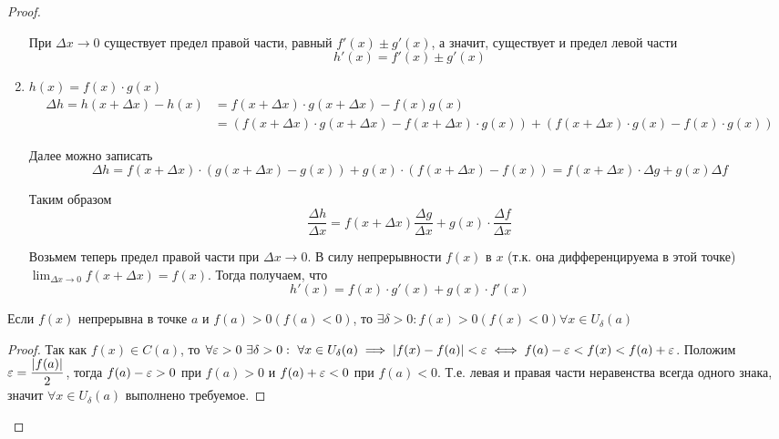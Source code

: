 \documentclass[a4paper]{article}
\theoremstyle{named}
\begin{document}
\begin{colloq}
\begin{proof}
\begin{enumerate}
				При $\Delta x \to 0$ существует предел правой части, равный $f'(x) \pm g'(x)$, а значит, существует и предел левой части
				\begin{equation*}
					h'(x) = f'(x) \pm g'(x)
				\end{equation*}


				\item
				$h(x) = f(x) \cdot g(x)$
				\begin{align*}
					\Delta h 
					= h(x + \Delta x) - h(x)
					&= f(x + \Delta x) \cdot g(x + \Delta x) - f(x)g(x) \\
					&=(f(x + \Delta x) \cdot g(x + \Delta x) - f(x + \Delta x) \cdot g(x)) + (f(x + \Delta x) \cdot g(x) - f(x) \cdot g(x))
				\end{align*}

				Далее можно записать
				\begin{equation*}
					\Delta h = f(x + \Delta x) \cdot (g(x + \Delta x) - g(x)) + g(x) \cdot (f(x + \Delta x) - f(x)) = f(x + \Delta x) \cdot \Delta g + g(x) \Delta f
				\end{equation*}

				Таким образом
				\begin{equation*}
					\dfrac{\Delta h}{\Delta x} = f(x + \Delta x) \dfrac{\Delta g}{\Delta x} + g(x) \cdot \dfrac{\Delta f}{\Delta x}
				\end{equation*}

				Возьмем теперь предел правой части при $\Delta x \to 0$. В силу непрерывности $f(x)$ в $x$ (т.к. она дифференцируема в этой точке) $\lim_{\Delta x \to 0} f(x + \Delta x) = f(x)$. Тогда получаем, что
				\begin{equation*}
					h'(x) = f(x) \cdot g'(x) + g(x) \cdot f'(x)
				\end{equation*}
			\end{enumerate}

			\begin{lemma}
				Если $f(x)$ непрерывна в точке $a$ и $f(a) > 0 (f(a) < 0)$, то $\exists \delta > 0: f(x) > 0 (f(x) < 0) \forall x \in U_{\delta}(a)$
			\end{lemma}

			\begin{proof}
				Так как $f(x) \in C(a)$, то $\forall \varepsilon > 0 \ \exists \delta > 0: \ \forall x \in U_{\delta}(a) \implies |f(x) - f(a)| < \varepsilon \iff f(a) - \varepsilon < f(x) < f(a) + \varepsilon$. Положим $\varepsilon = \dfrac{|f(a)|}{2}$, тогда $f(a) - \varepsilon > 0$ при $f(a) > 0$ и $f(a) + \varepsilon < 0$ при $f(a) < 0$. Т.е. левая и правая части неравенства всегда одного знака, значит $\forall x \in U_{\delta}(a)$ выполнено требуемое.
			\end{proof}


\end{proof}
\end{colloq}
\end{document}
